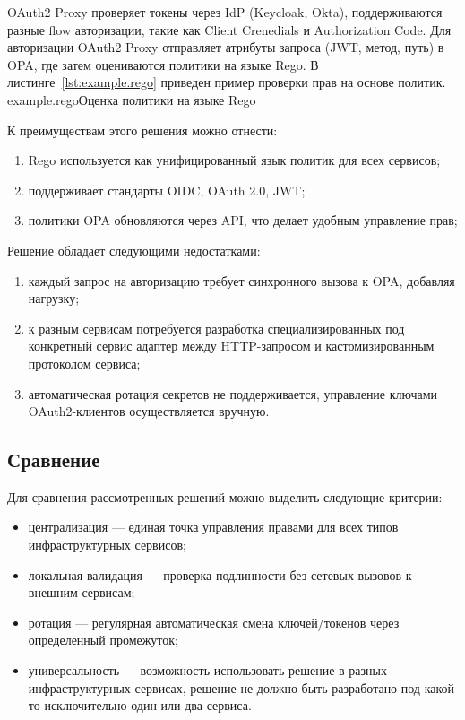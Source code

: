 OAuth2 Proxy проверяет токены через IdP (Keycloak, Okta), поддерживаются разные flow авторизации, такие как Client Crenedials и Authorization Code. Для авторизации OAuth2 Proxy отправляет атрибуты запроса (JWT, метод, путь) в OPA, где затем оцениваются политики на языке Rego. В листинге~\ref{lst:example.rego} приведен пример проверки прав на основе политик. 
	{example.rego}{Оценка политики на языке Rego}

К преимуществам этого решения можно отнести:
\begin{enumerate}
	\item Rego используется как унифицированный язык политик для всех сервисов;
	\item поддерживает стандарты OIDC, OAuth 2.0, JWT;
	\item политики OPA обновляются через API, что делает удобным управление прав;
\end{enumerate}

Решение обладает следующими недостатками:
\begin{enumerate}
	\item каждый запрос на авторизацию требует синхронного вызова к OPA, добавляя нагрузку;
	\item к разным сервисам потребуется разработка специализированных под конкретный сервис адаптер между HTTP-запросом и кастомизированным протоколом сервиса;
	\item автоматическая ротация секретов не поддерживается, управление ключами OAuth2-клиентов осуществляется вручную.
\end{enumerate} 

\subsection{Сравнение}

Для сравнения рассмотренных решений можно выделить следующие критерии:
\begin{itemize}
	\item централизация --- единая точка управления правами для всех типов инфраструктурных сервисов;
	\item локальная валидация --- проверка подлинности без сетевых вызовов к внешним сервисам;
	\item ротация --- регулярная автоматическая смена ключей/токенов через определенный промежуток;
	\item универсальность --- возможность использовать решение в разных инфраструктурных сервисах, решение не должно быть разработано под какой-то исключительно один или два сервиса.
\end{itemize}

